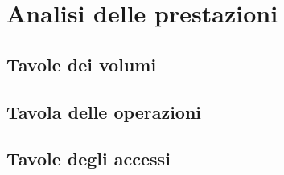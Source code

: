 \chapter{Analisi delle prestazioni}
\section{Tavole dei volumi}
\section{Tavola delle operazioni}
\section{Tavole degli accessi}
